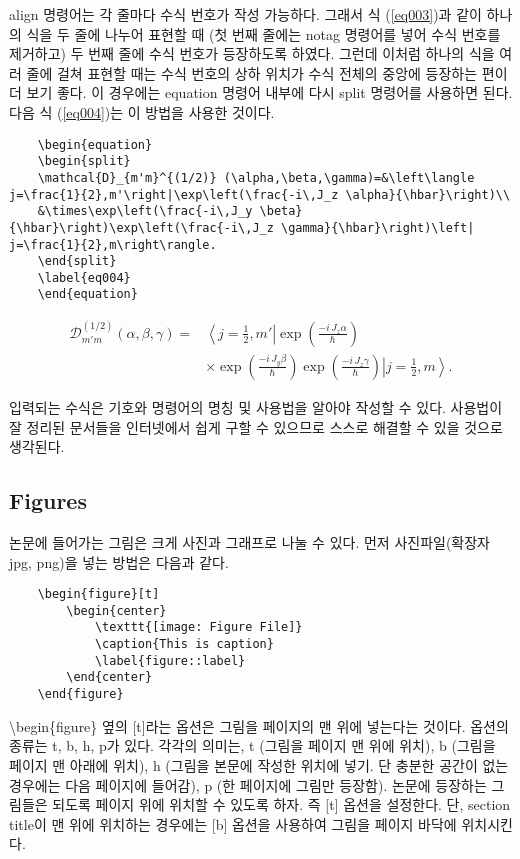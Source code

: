 \documentclass{gshs_thesis}
\begin{document}
align 명령어는 각 줄마다 수식 번호가 작성 가능하다. 그래서 식 (\ref{eq003})과 같이 하나의 식을 두 줄에 나누어 표현할 때 (첫 번째 줄에는 notag 명령어를 넣어 수식 번호를 제거하고) 두 번째 줄에 수식 번호가 등장하도록 하였다. 그런데 이처럼 하나의 식을 여러 줄에 걸쳐 표현할 때는 수식 번호의 상하 위치가 수식 전체의 중앙에 등장하는 편이 더 보기 좋다. 이 경우에는 equation 명령어 내부에 다시 split 명령어를 사용하면 된다. 다음 식 (\ref{eq004})는 이 방법을 사용한 것이다.
\begin{lstlisting}
	\begin{equation}
	\begin{split}
	\mathcal{D}_{m'm}^{(1/2)} (\alpha,\beta,\gamma)=&\left\langle j=\frac{1}{2},m'\right|\exp\left(\frac{-i\,J_z \alpha}{\hbar}\right)\\
	&\times\exp\left(\frac{-i\,J_y \beta}{\hbar}\right)\exp\left(\frac{-i\,J_z \gamma}{\hbar}\right)\left| j=\frac{1}{2},m\right\rangle.
	\end{split}
	\label{eq004}
	\end{equation}
\end{lstlisting}

\begin{equation}
\begin{split}
\mathcal{D}_{m'm}^{(1/2)} (\alpha,\beta,\gamma)=&\left\langle j=\frac{1}{2},m'\right|\exp\left(\frac{-i\,J_z \alpha}{\hbar}\right)\\
&\times\exp\left(\frac{-i\,J_y \beta}{\hbar}\right)\exp\left(\frac{-i\,J_z \gamma}{\hbar}\right)\left| j=\frac{1}{2},m\right\rangle.
\end{split}
\label{eq004}
\end{equation}

 입력되는 수식은 기호와 명령어의 명칭 및 사용법을 알아야 작성할 수 있다. 사용법이 잘 정리된 문서들을 인터넷에서 쉽게 구할 수 있으므로 스스로 해결할 수 있을 것으로 생각된다.


\subsection{Figures}
논문에 들어가는 그림은 크게 사진과 그래프로 나눌 수 있다. 먼저 사진파일(확장자 jpg, png)을 넣는 방법은 다음과 같다.
\begin{lstlisting}
	\begin{figure}[t]
		\begin{center}
			\texttt{[image: Figure File]}
			\caption{This is caption}
			\label{figure::label}
		\end{center}
	\end{figure}
\end{lstlisting}
{\textbackslash}begin\{figure\} 옆의 [t]라는 옵션은 그림을 페이지의 맨 위에 넣는다는 것이다. 옵션의 종류는 t, b, h, p가 있다. 각각의 의미는, t (그림을 페이지 맨 위에 위치), b (그림을 페이지 맨 아래에 위치), h (그림을 본문에 작성한 위치에 넣기. 단 충분한 공간이 없는 경우에는 다음 페이지에 들어감), p (한 페이지에 그림만 등장함). 논문에 등장하는 그림들은 되도록 페이지 위에 위치할 수 있도록 하자. 즉 [t] 옵션을 설정한다. 단, section title이 맨 위에 위치하는 경우에는 [b] 옵션을 사용하여 그림을 페이지 바닥에 위치시킨다.
\end{document}

